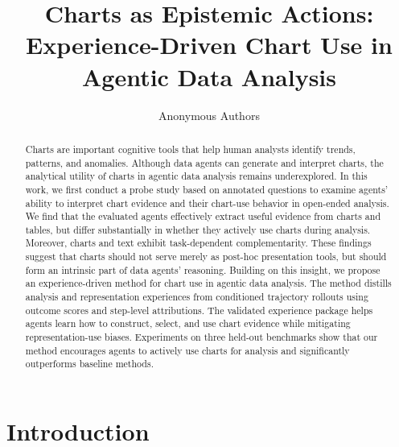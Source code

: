 \documentclass{article}
\title{Charts as Epistemic Actions: Experience-Driven Chart Use in Agentic Data Analysis}
\author{Anonymous Authors}
\begin{document}
\maketitle

\begin{abstract}

  
  Charts are important cognitive tools that help human analysts identify trends, patterns, and anomalies. Although data agents can generate and interpret charts, the analytical utility of charts in agentic data analysis remains underexplored. In this work, we first conduct a probe study based on annotated questions to examine agents' ability to interpret chart evidence and their chart-use behavior in open-ended analysis. We find that the evaluated agents effectively extract useful evidence from charts and tables, but differ substantially in whether they actively use charts during analysis. Moreover, charts and text exhibit task-dependent complementarity. These findings suggest that charts should not serve merely as post-hoc presentation tools, but should form an intrinsic part of data agents' reasoning. Building on this insight, we propose an experience-driven method for chart use in agentic data analysis. The method distills analysis and representation experiences from conditioned trajectory rollouts using outcome scores and step-level attributions. The validated experience package helps agents learn how to construct, select, and use chart evidence while mitigating representation-use biases. Experiments on three held-out benchmarks show that our method encourages agents to actively use charts for analysis and significantly outperforms baseline methods.
\end{abstract}

\section{Introduction}
\label{sec:introduction}
\end{document}
